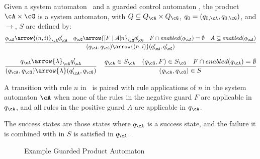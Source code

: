 %
\begin{definition}\label{def:prod2}
Given a system automaton \cA~and a guarded control automaton \cG, the product $\cA \times \cG$ is a system automaton, with $Q \subseteq Q_{\cA} \times Q_{\cG}$, $q_0 = (q_{0,\cA},q_{0,\cG})$, and ${\rightarrow}$, $S$ are defined by:
\begin{equation*}
\frac
{q_{\cA} \arrow{(n,i)}_{\cA} q_{\cA}' \quad
q_{\cG} \arrow{[F \mid A]n}_{\cG} q_{\cG}' \quad
F \cap enabled(q_{\cA}) = \emptyset \quad
A \subseteq enabled(q_{\cA}) } 
{(q_{\cA},q_{\cG}) \arrow{(n,i)} (q_{\cA}',q_{\cG}') }\\
\end{equation*}

\begin{equation*}
\frac{q_{\cA} \arrow{\lambda}_\cA q_{\cA}'}
{(q_\cA,q_\cG)\arrow{\lambda}(q_{\cA}',q_{\cG})}
\quad
\frac
{q_{\cA} \in S_{\cA} \quad
(q_{\cG},F) \in S_{\cG} \quad
F \cap enabled(q_{\cA}) = \emptyset }%
{(q_{\cA},q_{\cG}) \in S}\\
\end{equation*}
\end{definition}

A transition with rule $n$ in \cG~is paired with rule applications of $n$ in the system automaton $\cA$ when none of the rules in the negative guard $F$ are applicable in $q_{\cA}$, and all rules in the positive guard $A$ are applicable in $q_{\cA}$.

The success states are those states where $q_{\cA}$ is a success state, and the failure it is combined with in $S$ is satisfied in $q_{\cA}$.\\

\begin{figure}
\centering
{}
\caption{Example Guarded Product Automaton}
\label{fig:eprod_example}
\end{figure}

